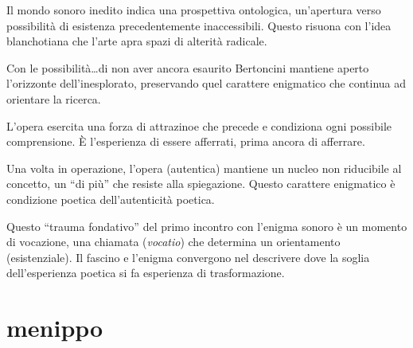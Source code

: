 Il mondo sonoro  inedito indica una prospettiva ontologica, un'apertura verso
possibilità di esistenza precedentemente inaccessibili. Questo risuona con
l'idea blanchotiana che l'arte apra spazi di alterità radicale.

Con le possibilità\ldots di non aver ancora esaurito Bertoncini mantiene aperto
l'orizzonte dell'inesplorato, preservando quel carattere enigmatico che continua
ad orientare la ricerca.

L'opera esercita una forza di attrazinoe che precede e condiziona ogni possibile
comprensione. È l'esperienza di essere afferrati, prima ancora di afferrare.

Una volta in operazione, l'opera (autentica) mantiene un nucleo non riducibile
al concetto, un “di più” che resiste alla spiegazione. Questo carattere
enigmatico è condizione poetica dell'autenticità poetica.

Questo “trauma fondativo” del primo incontro con l'enigma sonoro è un momento di
vocazione, una chiamata (\emph{vocatio}) che determina un orientamento
(esistenziale). Il fascino \cite{blanchot82} e l'enigma \cite{adorno} convergono
nel descrivere dove la soglia dell'esperienza poetica si fa esperienza di
trasformazione.

\section*{menippo}

